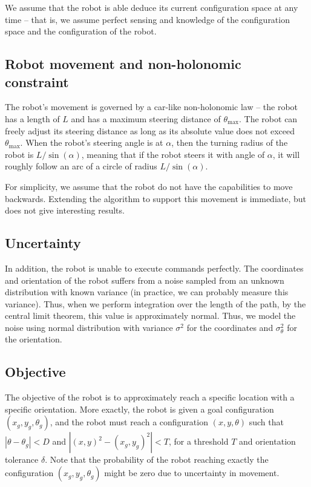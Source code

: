 \documentclass[a4paper]{article}
\begin{document}
We assume that the robot is able deduce its current configuration space at
any time -- that is, we assume perfect sensing and knowledge of the configuration space
and the configuration of the robot.

\subsection{Robot movement and non-holonomic constraint}
The robot's movement is governed by a car-like non-holonomic law -- the robot
has a length of $L$ and has a maximum steering distance of $\theta_{\text{max}}$.
The robot can freely adjust its steering distance as long as its absolute
value does not exceed $\theta_{\text{max}}$.  When the
robot's steering angle is at $\alpha$, then the turning radius of the robot
is $L / \sin(\alpha)$, meaning that if the robot steers it with angle of $\alpha$,
it will roughly follow an arc of a circle of radius $L / \sin(\alpha)$.

For simplicity, we assume that the robot do not have the capabilities to move
backwards. Extending the algorithm to support this movement is immediate, but
does not give interesting results.

\subsection{Uncertainty}
In addition, the robot is unable to execute commands perfectly. The coordinates
and orientation of the robot suffers from a noise sampled from an unknown distribution
with known variance (in practice, we can probably measure this variance).
Thus, when we perform integration over the length of the path, by the central
limit theorem, this value is approximately normal. Thus, we model the noise
using normal distribution with variance $\sigma^2$ for the coordinates and
$\sigma_\theta^2$ for the orientation.

\subsection{Objective}
The objective of the robot is to approximately reach a specific location with a
specific orientation. More exactly, the robot is given a goal configuration
$(x_g, y_g, \theta_g)$, and the robot must reach a configuration $(x, y, \theta)$
such that $|\theta - \theta_g| < D$ and $|(x, y)^2 - (x_g, y_g)^2| < T$,
for a threshold $T$ and orientation tolerance $\delta$. Note that the probability
of the robot reaching exactly the configuration $(x_g, y_g, \theta_g)$ might be
zero due to uncertainty in movement.
\end{document}

